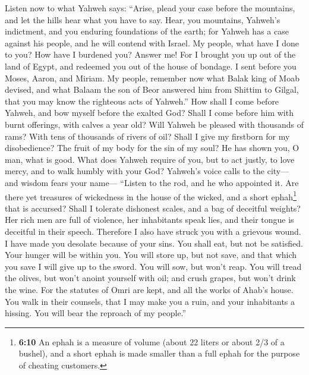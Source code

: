  Listen now to what Yahweh says: ``Arise, plead your case
before the mountains, and let the hills hear what you have to say.
 Hear, you mountains, Yahweh's indictment, and you
enduring foundations of the earth; for Yahweh has a case against his
people, and he will contend with Israel.  My people, what
have I done to you? How have I burdened you? Answer me! 
For I brought you up out of the land of Egypt, and redeemed you out of
the house of bondage. I sent before you Moses, Aaron, and Miriam.
 My people, remember now what Balak king of Moab devised,
and what Balaam the son of Beor answered him from Shittim to Gilgal,
that you may know the righteous acts of Yahweh.''  How
shall I come before Yahweh, and bow myself before the exalted God? Shall
I come before him with burnt offerings, with calves a year old?
 Will Yahweh be pleased with thousands of rams? With tens
of thousands of rivers of oil? Shall I give my firstborn for my
disobedience? The fruit of my body for the sin of my soul?
 He has shown you, O man, what is good. What does Yahweh
require of you, but to act justly, to love mercy, and to walk humbly
with your God?  Yahweh's voice calls to the city--- and
wisdom fears your name--- ``Listen to the rod, and he who appointed it.
 Are there yet treasures of wickedness in the house of
the wicked, and a short ephah\footnote{\textbf{6:10} An ephah is a
  measure of volume (about 22 liters or about 2/3 of a bushel), and a
  short ephah is made smaller than a full ephah for the purpose of
  cheating customers.} that is accursed?  Shall I
tolerate dishonest scales, and a bag of deceitful weights?
 Her rich men are full of violence, her inhabitants speak
lies, and their tongue is deceitful in their speech. 
Therefore I also have struck you with a grievous wound. I have made you
desolate because of your sins.  You shall eat, but not be
satisfied. Your hunger will be within you. You will store up, but not
save, and that which you save I will give up to the sword.
 You will sow, but won't reap. You will tread the olives,
but won't anoint yourself with oil; and crush grapes, but won't drink
the wine.  For the statutes of Omri are kept, and all the
works of Ahab's house. You walk in their counsels, that I may make you a
ruin, and your inhabitants a hissing. You will bear the reproach of my
people.''

